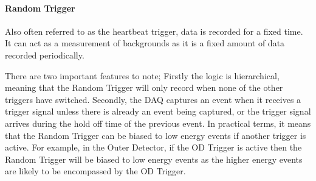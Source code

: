 \paragraph{Random Trigger}
Also often referred to as the heartbeat trigger, data is recorded for a fixed time.
It can act as a measurement of backgrounds as it is a fixed amount of data recorded periodically.


\par
There are two important features to note;
Firstly the logic is hierarchical, meaning that the Random Trigger will only record when none of the other triggers have switched.
Secondly, the DAQ captures an event when it receives a trigger signal unless there is already an event being captured, or the trigger signal arrives during the hold off time of the previous event.
In practical terms, it means that the Random Trigger can be biased to low energy events if another trigger is active.
For example, in the Outer Detector, if the OD Trigger is active then the Random Trigger will be biased to low energy events as the higher energy events are likely to be encompassed by the OD Trigger.

